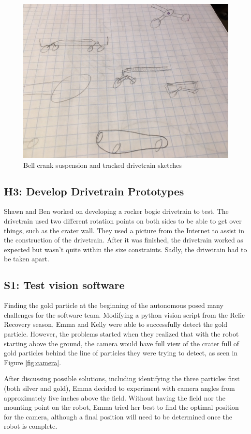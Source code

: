\documentclass{article}
\begin{document}
\begin{figure}
    \centering
    \includegraphics[width=.6\textwidth]{02_09-10/images/IMG_0256.JPG}
    \caption{Bell crank suspension and tracked drivetrain sketches}
    \label{fig:drivetrain sketches}
\end{figure}



\subsection{H3: Develop Drivetrain Prototypes}

Shawn and Ben worked on developing a rocker bogie drivetrain to test. The drivetrain used two different rotation points on both sides to be able to get over things, such as the crater wall. They used a picture from the Internet to assist in the construction of the drivetrain. After it was finished, the drivetrain worked as expected but wasn't quite within the size constraints. Sadly, the drivetrain had to be taken apart. 

\subsection{S1: Test vision software}

Finding the gold particle at the beginning of the autonomous posed many challenges for the software team. Modifying a python vision script from the Relic Recovery season, Emma and Kelly were able to successfully detect the gold particle. However, the problems started when they realized that with the robot starting above the ground, the camera would have full view of the crater full of gold particles behind the line of particles they were trying to detect, as seen in
Figure \ref{fig:camera}.

After discussing possible solutions, including identifying the three particles first (both silver and gold), Emma decided to experiment with camera angles from approximately five inches above the field. Without having the field nor the mounting point on the robot, Emma tried her best to find the optimal position for the camera, although a final position will need to be determined once the robot is complete. 
\end{document}
